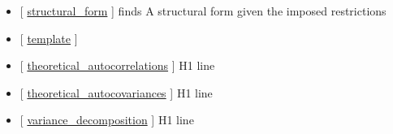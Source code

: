 \documentclass[letterpaper,10pt,english]{sphinxmanual}
\begin{document}
\begin{itemize}
\item {} 
{[} {\hyperref[classes/models/@rfvar/rfvar:structural-form]{structural\_form}} {]} finds A structural form given the imposed restrictions

\item {} 
{[} {\hyperref[classes/models/@rfvar/rfvar:template]{template}} {]}

\item {} 
{[} {\hyperref[classes/models/@rfvar/rfvar:theoretical-autocorrelations]{theoretical\_autocorrelations}} {]}   H1 line

\item {} 
{[} {\hyperref[classes/models/@rfvar/rfvar:theoretical-autocovariances]{theoretical\_autocovariances}} {]}   H1 line

\item {} 
{[} {\hyperref[classes/models/@rfvar/rfvar:variance-decomposition]{variance\_decomposition}} {]}   H1 line

\end{itemize}
\end{document}

